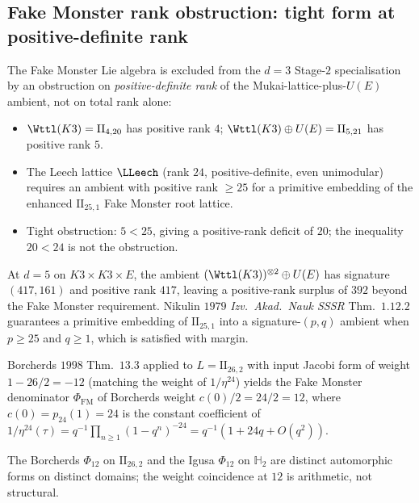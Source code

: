 \subsection{Fake Monster rank obstruction: tight form at
positive-definite rank}
\label{wn:subsec:second-pass-FM-rank}

\begin{theorem}
\label{wn:thm:second-pass-FM-rank}

The Fake Monster Lie algebra is excluded from the $d = 3$ Stage-$2$
specialisation by an obstruction on \emph{positive-definite rank} of
the Mukai-lattice-plus-$U(E)$ ambient, not on total rank alone:
\begin{itemize}
\item $\Wttl(K3) = \mathrm{II}_{4, 20}$ has positive rank $4$;
$\Wttl(K3) \oplus U(E) = \mathrm{II}_{5, 21}$ has positive rank $5$.
\item The Leech lattice $\LLeech$ (rank $24$, positive-definite, even
unimodular) requires an ambient with positive rank $\geq 25$ for a
primitive embedding of the enhanced $\mathrm{II}_{25, 1}$ Fake Monster
root lattice.
\item Tight obstruction: $5 < 25$, giving a positive-rank deficit of
$20$; the inequality $20 < 24$ is not the obstruction.
\end{itemize}

At $d = 5$ on $K3 \times K3 \times E$, the ambient
$(\Wttl(K3))^{\otimes 2} \oplus U(E)$ has signature $(417, 161)$ and
positive rank $417$, leaving a positive-rank surplus of $392$ beyond
the Fake Monster requirement. Nikulin $1979$ \emph{Izv.~Akad.~Nauk
SSSR} Thm.~$1.12.2$ guarantees a primitive embedding of $\mathrm{II}_{25,
1}$ into a signature-$(p, q)$ ambient when $p \geq 25$ and $q \geq 1$,
which is satisfied with margin.

Borcherds $1998$ Thm.~$13.3$ applied to
$L = \mathrm{II}_{26, 2}$ with input Jacobi form of weight
$1 - 26/2 = -12$ (matching the weight of $1/\eta^{24}$) yields the
Fake Monster denominator $\Phi_{\mathrm{FM}}$ of Borcherds weight
$c(0)/2 = 24/2 = 12$, where $c(0) = p_{24}(1) = 24$ is the constant
coefficient of $1/\eta^{24}(\tau) = q^{-1}\prod_{n \geq 1}
(1 - q^n)^{-24} = q^{-1}(1 + 24 q + O(q^2))$.

The Borcherds $\Phi_{12}$ on $\mathrm{II}_{26, 2}$ and the Igusa
$\Phi_{12}$ on $\mathbb{H}_2$ are distinct automorphic forms on
distinct domains; the weight coincidence at $12$ is arithmetic, not
structural.
\end{theorem}

